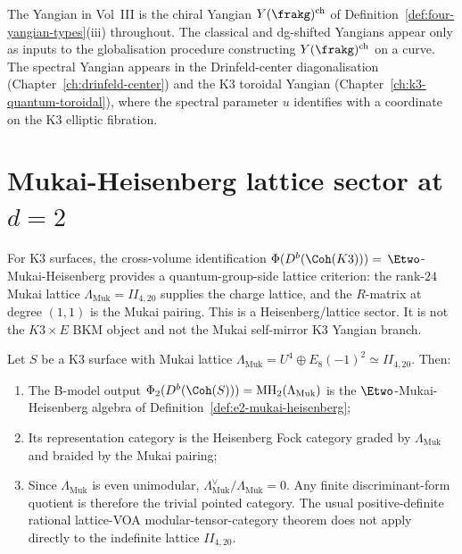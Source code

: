 \begin{remark}
\label{rem:vol3-yangian-scope}
The Yangian in Vol~III is the chiral Yangian
$Y(\frakg)^{\mathrm{ch}}$ of
Definition~\ref{def:four-yangian-types}(iii) throughout. The
classical and dg-shifted Yangians appear only as inputs to the
globalisation procedure constructing
$Y(\frakg)^{\mathrm{ch}}$ on a curve. The spectral Yangian appears
in the Drinfeld-center diagonalisation
(Chapter~\ref{ch:drinfeld-center}) and the K3 toroidal Yangian
(Chapter~\ref{ch:k3-quantum-toroidal}), where the spectral
parameter $u$ identifies with a coordinate on the K3 elliptic
fibration.
\end{remark}


\section{Mukai-Heisenberg lattice sector at \texorpdfstring{$d = 2$}{d = 2}}
\label{sec:mukai-heisenberg-kl}

For K3 surfaces, the cross-volume identification
$\Phi(D^b(\Coh(K3))) = $ $\Etwo$-Mukai-Heisenberg provides a
quantum-group-side lattice criterion: the rank-$24$ Mukai lattice
$\Lambda_{\mathrm{Muk}} = II_{4,20}$ supplies the charge lattice, and the
$R$-matrix at degree $(1,1)$ is the Mukai pairing. This is a
Heisenberg/lattice sector. It is not the $K3\times E$ BKM object and
not the Mukai self-mirror K3 Yangian branch.

\begin{proposition}
\label{prop:kl-k3-lattice}
Let $S$ be a K3 surface with Mukai lattice
$\Lambda_{\mathrm{Muk}} = U^4 \oplus E_8(-1)^2 \simeq II_{4,20}$.
Then:
\begin{enumerate}[label=(\roman*)]
 \item The B-model output
 $\Phi_2(D^b(\Coh(S))) = \mathrm{MH}_2(\Lambda_{\mathrm{Muk}})$
 is the $\Etwo$-Mukai-Heisenberg algebra of
 Definition~\ref{def:e2-mukai-heisenberg};
 \item Its representation category is the Heisenberg Fock category
 graded by $\Lambda_{\mathrm{Muk}}$ and braided by the Mukai pairing;
 \item Since $\Lambda_{\mathrm{Muk}}$ is even unimodular,
 $\Lambda_{\mathrm{Muk}}^{\vee}/\Lambda_{\mathrm{Muk}}=0$. Any finite discriminant-form
 quotient is therefore the trivial pointed category. The usual
 positive-definite rational lattice-VOA modular-tensor-category theorem
 does not apply directly to the indefinite lattice $II_{4,20}$.
\end{enumerate}
\end{proposition}

